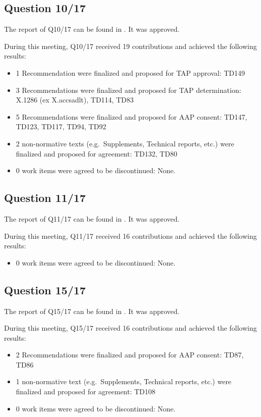 \subsection{Question 10/17}

The report of Q10/17 can be found in . It was approved.

During this meeting, Q10/17 received 19 contributions and achieved the following results:

\begin{itemize}
  \item 1 Recommendation were finalized and proposed for TAP approval: TD149
  \item 3 Recommendations were finalized and proposed for TAP determination: X.1286 (ex X.accsadlt), TD114, TD83
  \item 5 Recommendations were finalized and proposed for AAP consent: TD147, TD123, TD117, TD94, TD92
  \item 2 non-normative texts (e.g.\ Supplements, Technical reports, etc.) were finalized and proposed for agreement: TD132, TD80
  \item 0 work items were agreed to be discontinued: None.
\end{itemize}

\subsection{Question 11/17}

The report of Q11/17 can be found in . It was approved.

During this meeting, Q11/17 received 16 contributions and achieved the following results:

\begin{itemize}
  \item 0 work items were agreed to be discontinued: None.
\end{itemize}

\subsection{Question 15/17}

The report of Q15/17 can be found in . It was approved.

During this meeting, Q15/17 received 16 contributions and achieved the following results:

\begin{itemize}
  \item 2 Recommendations were finalized and proposed for AAP consent: TD87, TD86
  \item 1 non-normative text (e.g.\ Supplements, Technical reports, etc.) were finalized and proposed for agreement: TD108
  \item 0 work items were agreed to be discontinued: None.
\end{itemize}
